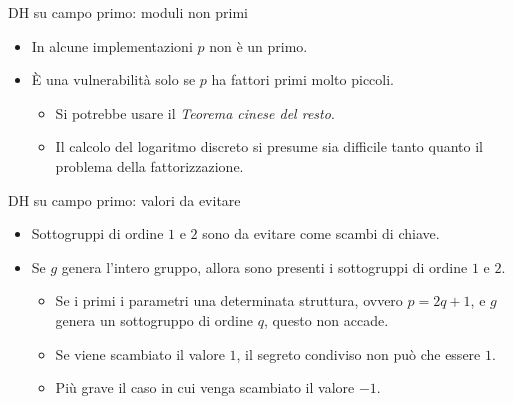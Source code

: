 \documentclass[11pt,svgnames,smaller,aspectratio=169,italian]{beamer}
\begin{document}
\begin{frame}{DH su campo primo: moduli non primi}
	\begin{itemize}
		\item In alcune implementazioni $p$ non è un primo.
		\item È una vulnerabilità solo se $p$ ha fattori primi molto piccoli.
			\begin{itemize}
				\item Si potrebbe usare il \emph{Teorema cinese del resto}.
				\item Il calcolo del logaritmo discreto si presume sia difficile tanto quanto il problema della fattorizzazione.
			\end{itemize}
	\end{itemize}
\end{frame}

\begin{frame}{DH su campo primo: valori da evitare}
	\begin{itemize}
		\item Sottogruppi di ordine $1$ e $2$ sono da evitare come scambi di chiave.
		\item Se $g$ genera l'intero gruppo, allora sono presenti i sottogruppi di ordine $1$ e $2$.
			\begin{itemize}
				\item Se i primi i parametri una determinata struttura, ovvero $p = 2q + 1$, e $g$ genera un sottogruppo di ordine $q$, questo non accade.
				\item Se viene scambiato il valore $1$, il segreto condiviso non può che essere $1$.
				\item Più grave il caso in cui venga scambiato il valore $-1$.
			\end{itemize}
	\end{itemize}
\end{frame}
\end{document}
